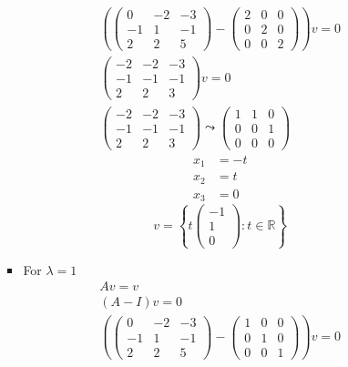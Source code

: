 \begin{enumerate}
\begin{enumerate}[(i)]
\begin{itemize}
\begin{gather}
\left(\begin{pmatrix}
0 & -2 & -3\\
-1 & 1 & -1\\
2 & 2 & 5
\end{pmatrix}
-
\begin{pmatrix}
2 & 0 & 0\\
0 & 2 & 0\\
0 & 0 & 2
\end{pmatrix}
\right)v = 0\\
\begin{pmatrix}
-2 & -2 &   -3\\
-1 & -1 & -1\\
2 & 2 & 3
\end{pmatrix}
v=0\\
\begin{pmatrix}
-2 & -2 &   -3\\
-1 & -1 & -1\\
2 & 2 & 3
\end{pmatrix}
\leadsto
\begin{pmatrix}
1 & 1 & 0\\
0 & 0 & 1\\
0 & 0 & 0
\end{pmatrix}
\end{gather}
\begin{align}
x_1 &= -t \\
x_2 &= t\\
x_3 &= 0
\end{align}
\begin{equation}
v= \left\{t\begin{pmatrix}-1\\1\\0\end{pmatrix}\colon t \in \mathbb{R}\right\}
\end{equation}
\item For $\lambda=1$
\begin{gather}
Av = v\\
(A-I)v = 0\\
\left(
\begin{pmatrix}
0 & -2  & -3\\
-1 & 1 & -1\\
2 & 2 & 5
\end{pmatrix}
-
\begin{pmatrix}
1 & 0 & 0\\
0 & 1 & 0\\
0 & 0 & 1
\end{pmatrix}
\right)v = 0\\

\end{gather}
\end{itemize}
\end{enumerate}
\end{enumerate}
